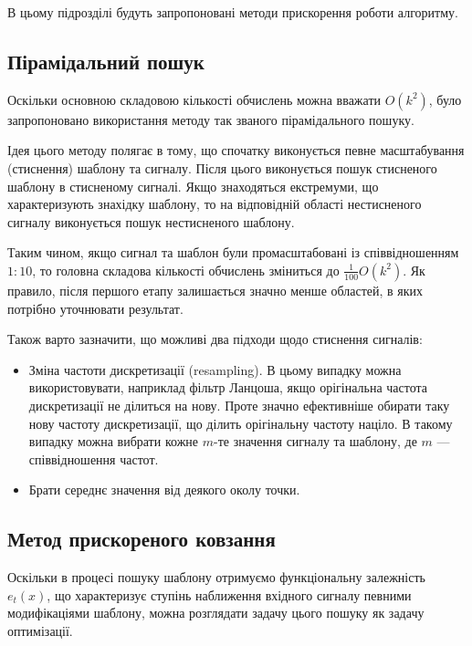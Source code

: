     В цьому підрозділі будуть запропоновані методи прискорення роботи алгоритму.

    \subsection{Пірамідальний пошук}
        Оскільки основною складовою кількості обчислень можна вважати $O(k^2)$, було запропоновано використання методу
        так званого пірамідального пошуку.~\cite{book1}~\cite{book2}

        Ідея цього методу полягає в тому, що спочатку виконується певне масштабування (стиснення) шаблону та сигналу.
        Після цього виконується пошук стисненого шаблону в стисненому сигналі.
        Якщо знаходяться екстремуми, що характеризують знахідку шаблону, то на відповідній області нестисненого
        сигналу виконується пошук нестисненого шаблону.

        Таким чином, якщо сигнал та шаблон були промасштабовані із співвідношенням $1:10$, то головна складова
        кількості обчислень зміниться до $\frac{1}{100} O(k^2)$.
        Як правило, після першого етапу залишається значно менше областей, в яких потрібно уточнювати результат.

        Також варто зазначити, що можливі два підходи щодо стиснення сигналів:
        \begin{itemize}
            \item Зміна частоти дискретизації (resampling).
                В цьому випадку можна використовувати, наприклад фільтр Ланцоша, якщо орігінальна частота
                дискретизації не ділиться на нову.
                Проте значно ефективніше обирати таку нову частоту дискретизації, що ділить орігінальну частоту
                націло.
                В такому випадку можна вибрати кожне $m$-те значення сигналу та шаблону, де $m$ --- співвідношення
                частот.~\cite{book3}
            \item Брати середнє значення від деякого околу точки.
        \end{itemize}
    \subsection{Метод прискореного ковзання}
        Оскільки в процесі пошуку шаблону отримуємо функціональну залежність $e_t(x)$, що характеризує ступінь
        наближення вхідного сигналу певними модифікаціями шаблону, можна розглядати задачу цього пошуку як задачу
        оптимізації.

